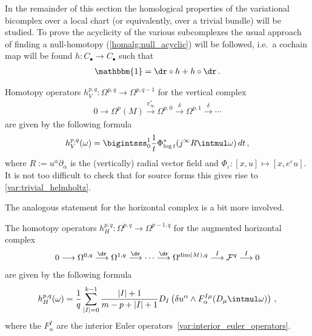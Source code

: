     In the remainder of this section the homological properties of the variational bicomplex over a local chart (or equivalently, over a trivial bundle) will be studied. To prove the acyclicity of the various subcomplexes the usual approach of finding a null-homotopy (\cref{homalg:null_acyclic}) will be followed, i.e.~a cochain map will be found $h:C_\bullet\rightarrow C_\bullet$ such that
    \begin{gather}
        \mathbbm{1} = \dr\circ h + h\circ\dr\,.
    \end{gather}

    \begin{property}
        Homotopy operators $h^{p,q}_V:\Omega^{p,q}\rightarrow\Omega^{p,q-1}$ for the vertical complex
        \begin{gather}
            0\longrightarrow\Omega^p(M)\overset{\pi_\infty^*}{\longrightarrow}\Omega^{p,0}\overset{\delta}{\longrightarrow}\Omega^{p,1}\overset{\delta}{\longrightarrow}\cdots
        \end{gather}
        are given by the following formula
        \begin{gather}
            h^{p,q}_V(\omega) = \bigintsss_0^1\frac{1}{t}\Phi^*_{\log t}(j^\infty R\intmul\omega)\,dt\,,
        \end{gather}
        where $R:=u^\alpha\partial_\alpha$ is the (vertically) radial vector field and $\Phi_\varepsilon:[x,u]\mapsto[x,e^\varepsilon u]$. It is not too difficult to check that for source forms this gives rise to \cref{var:trivial_helmholtz}.
    \end{property}
    The analogous statement for the horizontal complex is a bit more involved.
    \begin{property}
        The homotopy operators $h^{p,q}_H:\Omega^{p,q}\rightarrow\Omega^{p-1,q}$ for the augmented horizontal complex
        \begin{gather}
            0\longrightarrow\Omega^{0,q}\overset{\dr}{\longrightarrow}\Omega^{1,q}\overset{\dr}{\longrightarrow}\cdots\overset{\dr}{\longrightarrow}\Omega^{\dim(M),q}\overset{I}{\longrightarrow}\mathcal{F}^q\overset{I}{\longrightarrow}0
        \end{gather}
        are given by the following formula
        \begin{gather}
            h^{p,q}_H(\omega) = \frac{1}{q}\sum_{|I|=0}^{k-1}\frac{|I|+1}{m-p+|I|+1}D_I\left(\delta u^\alpha\wedge F^{I\mu}_\alpha(D_\mu\intmul\omega)\right)\,,
        \end{gather}
        where the $F^I_\alpha$ are the interior Euler operators~\eqref{var:interior_euler_operators}.
    \end{property}
